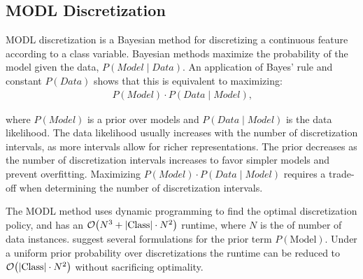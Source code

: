 
\subsection{MODL Discretization}
MODL discretization \citep{Boulle_2006} is a Bayesian method for discretizing a continuous feature according to a class variable. Bayesian methods maximize the probability of the model given the data, $P(\textit{Model} \mid \textit{Data})$. An application of Bayes' rule and constant $P(\textit{Data})$ shows that this is equivalent to maximizing:
\begin{align}
P(\textit{Model}) \cdot P(\textit{Data} \mid \textit{Model})\text{,}
\end{align}

\noindent
where $P(\textit{Model})$ is a prior over models and ${P(\textit{Data} \mid \textit{Model})}$ is the data likelihood.
The data likelihood usually increases with the number of discretization intervals, as more intervals allow for richer representations.
The prior decreases as the number of discretization intervals increases to favor simpler models and prevent overfitting.
Maximizing ${P(\textit{Model}) \cdot P(\textit{Data} \mid \textit{Model})}$ requires a trade-off when determining the number of discretization intervals.

The MODL method uses dynamic programming to find the optimal discretization policy, and has an $\bigo\paren{N^3 + |\text{Class}| \cdot N^2}$ runtime, where $N$ is the of number of data instances.
\cite{Lustgarten_2011} suggest several formulations for the prior term $P(\text{Model})$.
Under a uniform prior probability over discretizations the runtime can be reduced to $\bigo\paren{|\text{Class}| \cdot N^2}$ without sacrificing optimality.

